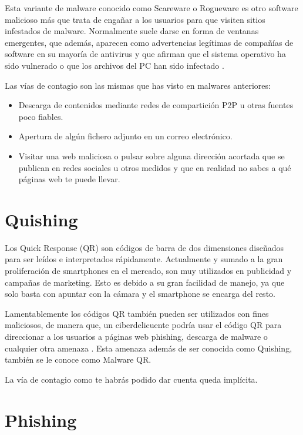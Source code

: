 \documentclass[
  a4paper,
  openany]{book}
\begin{document}
Esta variante de malware conocido como Scareware o Rogueware es otro software malicioso más que trata de engañar a los usuarios para que visiten sitios infestados de malware. Normalmente suele darse en forma de ventanas emergentes, que además, aparecen como advertencias legítimas de compañías de software en su mayoría de antivirus y que afirman que el sistema operativo ha sido vulnerado o que los archivos del PC han sido infectado \citep{KASPER-scareware}.

Las vías de contagio son las mismas que has visto en malwares anteriores:

\begin{itemize}
\item
  Descarga de contenidos mediante redes de compartición P2P u otras fuentes poco fiables.
\item
  Apertura de algún fichero adjunto en un correo electrónico.
\item
  Visitar una web maliciosa o pulsar sobre alguna dirección acortada que se publican en redes sociales u otros medidos y que en realidad no sabes a qué páginas web te puede llevar.
\end{itemize}

\hypertarget{quishing}{%
\section{Quishing}\label{quishing}}

Los Quick Response (QR) son códigos de barra de dos dimensiones diseñados para ser leídos e interpretados rápidamente. Actualmente y sumado a la gran proliferación de smartphones en el mercado, son muy utilizados en publicidad y campañas de marketing. Esto es debido a su gran facilidad de manejo, ya que solo basta con apuntar con la cámara y el smartphone se encarga del resto.

Lamentablemente los códigos QR también pueden ser utilizados con fines maliciosos, de manera que, un ciberdelicuente podría usar el código QR para direccionar a los usuarios a páginas web phishing, descarga de malware o cualquier otra amenaza \citep{ESET-malware-qr}. Esta amenaza además de ser conocida como Quishing, también se le conoce como Malware QR.

La vía de contagio como te habrás podido dar cuenta queda implícita.

\hypertarget{phishing}{%
\section{Phishing}\label{phishing}}
\end{document}
